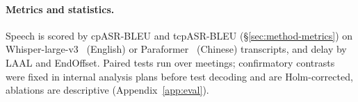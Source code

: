 \paragraph{Metrics and statistics.} Speech is scored by cpASR-BLEU and tcpASR-BLEU (\S\ref{sec:method-metrics}) on
Whisper-large-v3~\citep{radford2023robust} (English) or Paraformer~\citep{gao2022paraformer} (Chinese) transcripts, and
delay by LAAL and EndOffset. Paired tests run over meetings; confirmatory contrasts were fixed in internal analysis
plans before test decoding and are Holm-corrected, ablations are descriptive (Appendix~\ref{app:eval}).
